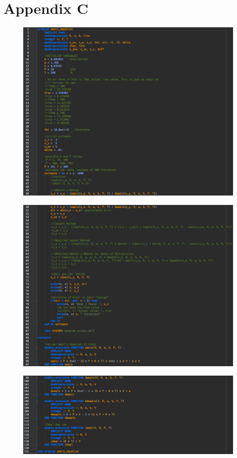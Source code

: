 \documentclass[12pt, letterpaper]{article}
\begin{document}
	\clearpage
	
	\section{Appendix C}
		\begin{figure}[h]
			\centering
			\includegraphics[width=.864\linewidth]{waalsCode0.png}
		\end{figure}
		\begin{figure}[h]
			\centering
			\includegraphics[width=\linewidth]{waalsCode1.png}
		\end{figure}
		\begin{figure}[h]
			\centering
			\includegraphics[width=\linewidth]{waalsCode2.png}
		\end{figure}
\end{document}
